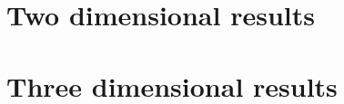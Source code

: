 \documentclass[11pt]{article}
\begin{document}
\section{Two dimensional results} \label{sec:twoDimensionalResults}


\clearpage
\section{Three dimensional results} \label{sec:threeDimensionalResults}



\clearpage


\end{document}
